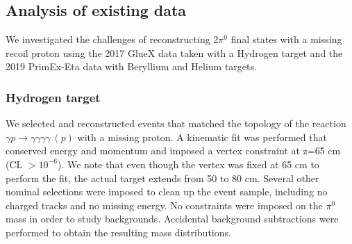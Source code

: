 
\subsection{Analysis of existing data}
We investigated the challenges of reconstructing 2$\pi^0$ final states
with a missing recoil proton using the 2017 GlueX data taken with a
Hydrogen target and the 2019 PrimEx-Eta data with Beryllium and Helium targets.
\subsubsection*{Hydrogen target}
  We selected and reconstructed events that matched the
topology of the reaction $\gamma p\rightarrow \gamma \gamma \gamma
\gamma\, (p)$ with a missing proton. A kinematic fit was performed
that conserved energy and momentum and imposed a vertex constraint at
z=65 cm (CL $> 10^{-6}$). We note that even though the vertex was
fixed at 65 cm to perform the fit, the actual target extends from 50
to 80 cm. Several other nominal selections were imposed to clean up
the event sample, including no charged tracks and no missing
energy. No constraints were imposed on the $\pi^0$ mass in order to
study backgrounds. Accidental background subtractions were performed
to obtain the resulting mass distributions.
